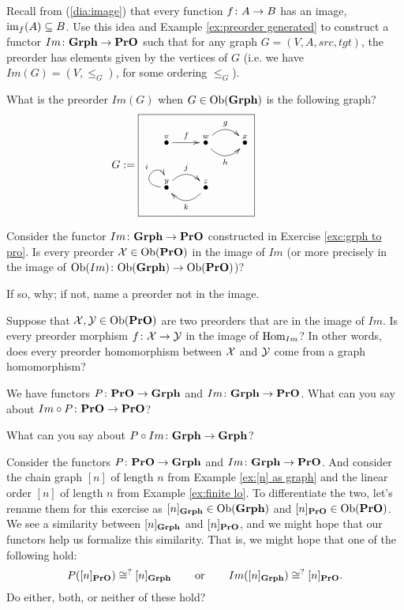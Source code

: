 \documentclass[CT4S-EN-RU]{subfiles}
\begin{document}
\begin{exercise}\label{exc:grph to pro}
Recall from (\ref{dia:image}) that every function $f\colon A\rightarrow B$ has an image, $\textnormal{im}_f(A)\subseteq B$. Use this idea and Example \ref{ex:preorder generated} to construct a functor $Im\colon{\bf Grph}\rightarrow{\bf PrO}$ such that for any graph $G=(V,A,src,tgt)$, the preorder has elements given by the vertices of $G$ (i.e. we have $Im(G)=(V,\leq_G)$, for some ordering $\leq_G$).
\end{exercise}

\begin{exercise}
What is the preorder $Im(G)$ when $G\in\textnormal{Ob}({\bf Grph})$ is the following graph?
$$
G:=\parbox{2in}{\fbox{\xymatrix{\LMO{v}\ar[r]^f&\LMO{w}\ar@/_1pc/[r]_h\ar@/^1pc/[r]^g&\LMO{x}\\\LMO{y}\ar@(l,u)[]^i\ar@/^1pc/[r]^j&\LMO{z}\ar@/^1pc/[l]^k}}}
$$
\end{exercise}

\begin{exercise}
Consider the functor $Im\colon{\bf Grph}\rightarrow{\bf PrO}$ constructed in Exercise \ref{exc:grph to pro}.
\sexc Is every preorder $\mathcal{X}\in\textnormal{Ob}({\bf PrO})$ in the image of $Im$ (or more precisely in the image of $\textnormal{Ob}(Im)\colon\textnormal{Ob}({\bf Grph})\rightarrow\textnormal{Ob}({\bf PrO})$)?
\item If so, why; if not, name a preorder not in the image.
\item Suppose that $\mathcal{X},\mathcal{Y}\in\textnormal{Ob}({\bf PrO})$ are two preorders that are in the image of $Im$. Is every preorder morphism $f\colon\mathcal{X}\rightarrow\mathcal{Y}$ in the image of $\textnormal{Hom}_{Im}$? In other words, does every preorder homomorphism between $\mathcal{X}$ and $\mathcal{Y}$ come from a graph homomorphism?
\endsexc
\end{exercise}

\begin{exercise}
We have functors $P\colon{\bf PrO}\rightarrow{\bf Grph}$ and $Im\colon{\bf Grph}\rightarrow{\bf PrO}$.
\sexc What can you say about $Im\circ P\colon{\bf PrO}\rightarrow{\bf PrO}$?
\item What can you say about $P\circ Im\colon{\bf Grph}\rightarrow{\bf Grph}$?
\endsexc
\end{exercise}

\begin{exercise}
Consider the functors $P\colon{\bf PrO}\rightarrow{\bf Grph}$ and $Im\colon{\bf Grph}\rightarrow{\bf PrO}$. And consider the chain graph $[n]$ of length $n$ from Example \ref{ex:[n] as graph} and the linear order $[n]$ of length $n$ from Example \ref{ex:finite lo}. To differentiate the two, let's rename them for this exercise as $[n]_{{\bf Grph}}\in\textnormal{Ob}({\bf Grph})$ and $[n]_{{\bf PrO}}\in\textnormal{Ob}({\bf PrO})$. We see a similarity between $[n]_{{\bf Grph}}$ and $[n]_{{\bf PrO}}$, and we might hope that our functors help us formalize this similarity. That is, we might hope that one of the following hold: 
$$P([n]_{{\bf PrO}})\cong^? [n]_{{\bf Grph}}\hspace{.3in}\textnormal{or}\hspace{.3in} Im([n]_{{\bf Grph}})\cong^? [n]_{{\bf PrO}}.$$ 
Do either, both, or neither of these hold?
\end{exercise}
\end{document}
